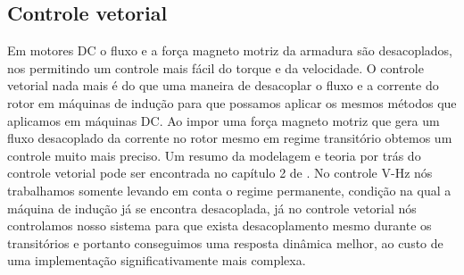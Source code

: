 \documentclass{article}
\begin{document}
\subsection{Controle vetorial}
Em motores DC o fluxo e a força magneto motriz da armadura são desacoplados, nos permitindo um controle mais fácil do torque e da velocidade. O controle vetorial nada mais é do que uma maneira de desacoplar o fluxo e a corrente do rotor em máquinas de indução para que possamos aplicar os mesmos métodos que aplicamos em máquinas DC. Ao impor uma força magneto motriz que gera um fluxo desacoplado da corrente no rotor mesmo em regime transitório obtemos um controle muito mais preciso. Um resumo da modelagem e teoria por trás do controle vetorial pode ser encontrada no capítulo 2 de \cite{bb:asley}. No controle V-Hz nós trabalhamos somente levando em conta o regime permanente, condição na qual a máquina de indução já se encontra desacoplada, já no controle vetorial nós controlamos nosso sistema para que exista desacoplamento mesmo durante os transitórios e portanto conseguimos uma resposta dinâmica melhor, ao custo de uma implementação significativamente mais complexa.

\end{document}
